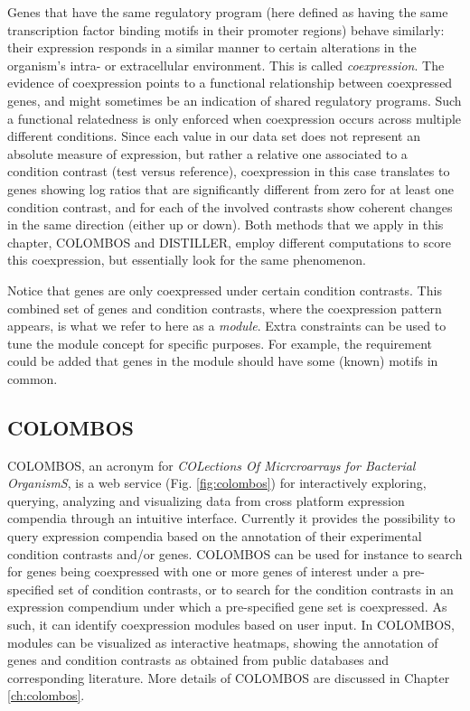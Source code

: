 Genes that have the same regulatory program (here defined as having the same 
transcription factor binding motifs in their promoter regions) behave 
similarly: their expression responds in a similar manner to certain alterations 
in the organism's intra- or extracellular environment. This is called 
\textit{coexpression}. The evidence of coexpression points to a functional 
relationship between coexpressed genes, and might sometimes be an indication of 
shared regulatory programs. 
Such a functional relatedness is only enforced when 
coexpression occurs across multiple different conditions. Since each value in 
our data set does not represent an absolute measure of expression, but rather a 
relative one associated to a condition contrast (test versus reference), 
coexpression in this case translates to genes showing log ratios that are 
significantly different from zero for at least one condition contrast, and for 
each of the involved contrasts show coherent changes in the same direction 
(either up or down). Both methods that we apply in this chapter, COLOMBOS and 
DISTILLER, employ different computations to score this coexpression, but 
essentially look for the same phenomenon.

Notice that genes are only coexpressed under certain condition contrasts. This 
combined set of genes and condition contrasts, where the coexpression pattern 
appears, is what we refer to here as a \textit{module}. Extra constraints can 
be used to tune the module concept for specific purposes. For example, the 
requirement could be added that genes in the module should have some (known) 
motifs in common.


\subsection{COLOMBOS}
COLOMBOS, an acronym for \textit{COLections Of Micrcroarrays for Bacterial 
OrganismS}, is a web service \cite{COLOMBOS} (Fig. \ref{fig:colombos}) for 
interactively exploring, querying, analyzing and visualizing data from cross 
platform expression compendia through an intuitive interface. 
Currently it 
provides the possibility to query expression compendia based on the annotation 
of their experimental condition contrasts and/or genes. COLOMBOS can be used 
for instance to search for genes being coexpressed with one or more genes of 
interest under a pre-specified set of condition contrasts, or to search for the 
condition contrasts in an expression compendium under which a pre-specified 
gene set is coexpressed. As such, it can identify coexpression modules based on 
user input. In COLOMBOS, modules can be visualized as interactive heatmaps, 
showing the annotation of genes and condition contrasts as obtained from public 
databases and corresponding literature. More details of COLOMBOS are discussed 
in Chapter \ref{ch:colombos}.

